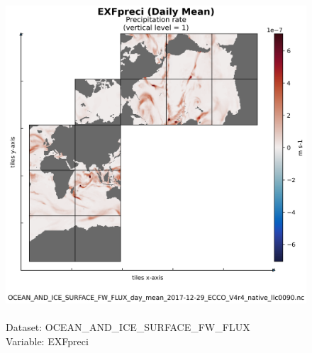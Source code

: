 \begin{figure}[H]
\centering
\includegraphics[scale=0.5]{../images/plots/native_plots/Ocean_and_Sea-Ice_Surface_Freshwater_Fluxes/EXFpreci.png}
\caption{\\Dataset: OCEAN\_AND\_ICE\_SURFACE\_FW\_FLUX\\Variable: EXFpreci}
\label{tab:table-OCEAN_AND_ICE_SURFACE_FW_FLUX_EXFpreci-Plot}
\end{figure}
\pagebreak
